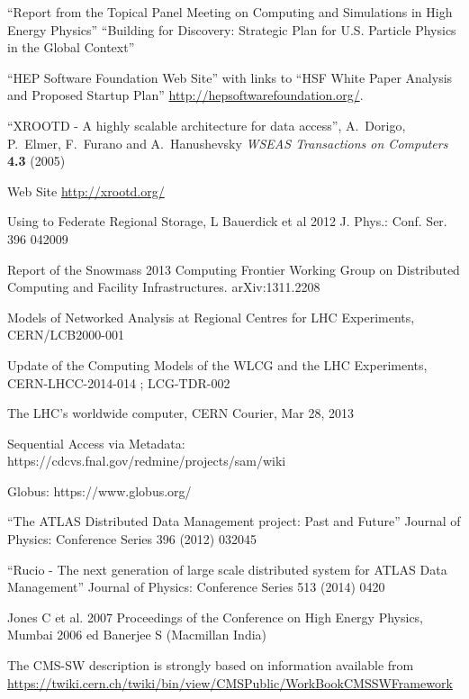 \begin{thebibliography}{99}
 ``Report from the Topical Panel Meeting on Computing and
Simulations in High Energy Physics''
 ``Building for Discovery: Strategic Plan for U.S. Particle Physics in the Global Context''

 ``HEP Software Foundation Web Site'' with links to ``HSF White Paper Analysis and Proposed Startup Plan'' \url{http://hepsoftwarefoundation.org/}.

 ``XROOTD - A highly scalable architecture for data access'', A.\ Dorigo, P.\ Elmer, F.\ Furano and A.\ Hanushevsky {\it WSEAS Transactions on Computers} {\bf 4.3} (2005)

 \xrootd Web Site \url{http://xrootd.org/}

 Using \xrootd to Federate Regional Storage, L Bauerdick et al 2012 J. Phys.: Conf. Ser. 396 042009

 Report of the Snowmass 2013 Computing Frontier Working Group on Distributed Computing and Facility Infrastructures. arXiv:1311.2208

 Models of Networked Analysis at Regional Centres for LHC Experiments, CERN/LCB2000-001

 Update of the Computing Models of the WLCG and the LHC Experiments, CERN-LHCC-2014-014 ; LCG-TDR-002

 The LHC’s worldwide computer, CERN Courier, Mar 28, 2013

 Sequential Access via Metadata: https://cdcvs.fnal.gov/redmine/projects/sam/wiki

 Globus: https://www.globus.org/

 ``The ATLAS Distributed Data Management project: Past and Future'' Journal of Physics: Conference Series 396 (2012) 032045

 ``Rucio - The next generation of large scale distributed system for ATLAS Data Management'' Journal of Physics: Conference Series 513 (2014) 0420


 Jones C et al. 2007 Proceedings of the Conference on High Energy Physics, Mumbai 2006 ed Banerjee S (Macmillan India)

 The CMS-SW description is strongly based on information available from \url{https://twiki.cern.ch/twiki/bin/view/CMSPublic/WorkBookCMSSWFramework}


\end{thebibliography}
